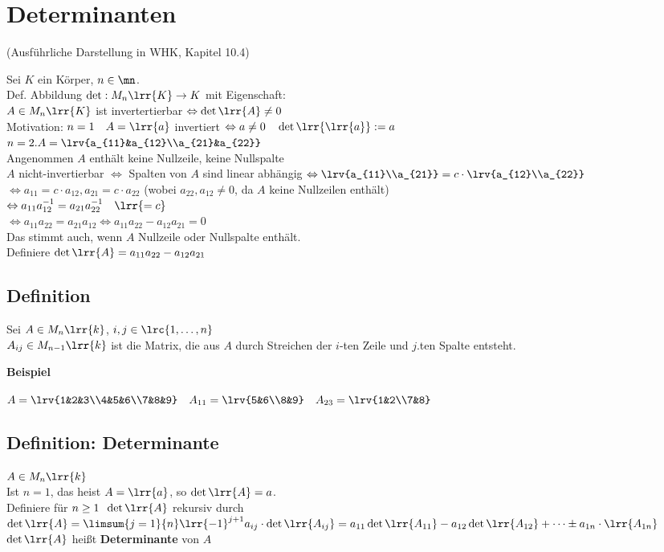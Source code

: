 \newpage
\section{Determinanten}
	(Ausführliche Darstellung in WHK, Kapitel 10.4)

	Sei $K$ ein Körper, $n\in\mn$.\\
	Def. Abbildung $\det:M_n\lrr{K}\rightarrow K$ mit Eigenschaft:\\
	$A\in M_n\lrr{K}$ ist invertertierbar $\Leftrightarrow\det\lrr{A}\neq 0$\\
	Motivation: $n=1\quad A=\lrr{a}$ invertiert $\Leftrightarrow a\neq 0\quad\det\lrr{\lrr{a}}:=a$\\
	$n=2. A=\lrv{a_{11}&a_{12}\\a_{21}&a_{22}}$\\
	Angenommen $A$ enthält keine Nullzeile, keine Nullspalte\\
	$A$ nicht-invertierbar $\Leftrightarrow$ Spalten von $A$ sind linear abhängig $\Leftrightarrow\lrv{a_{11}\\a_{21}}=c\cdot\lrv{a_{12}\\a_{22}}$\\
	$\Leftrightarrow a_{11}=c\cdot a_{12}, a_{21}=c\cdot a_{22}$ (wobei $a_{22},a_{12}\neq 0$, da $A$ keine Nullzeilen enthält)\\
	$\Leftrightarrow a_{11}a_{12}^{-1}=a_{21}a_{22}^{-1}\quad \lrr{=c}$\\
	$\Leftrightarrow a_{11}a_{22}=a_{21}a_{12}\Leftrightarrow a_{11}a_{22}-a_{12}a_{21}=0$\\
	Das stimmt auch, wenn $A$ Nullzeile oder Nullspalte enthält.\\
	Definiere $\det\lrr{A}=a_{11}a_{22}-a_{12}a_{21}$

\subsection{Definition}
	Sei $A\in M_n\lrr{k}$, $i,j\in\lrc{1,\dots,n}$\\
	$A_{ij}\in M_{n-1}\lrr{k}$ ist die Matrix, die aus $A$ durch Streichen der $i$-ten Zeile und $j$.ten Spalte entsteht.

	\textbf{Beispiel}

	$A=\lrv{1&2&3\\4&5&6\\7&8&9}\quad A_{11}=\lrv{5&6\\8&9}\quad A_{23}=\lrv{1&2\\7&8}$

\subsection{Definition: Determinante}
	$A\in M_n\lrr{k}$\\
	Ist $n=1$, das heist $A=\lrr{a}$, so $\det\lrr{A}=a$.\\
	Definiere für $n\geq 1 \;\; \det\lrr{A}$ rekursiv durch\\
  $\det\lrr{A}=\limsum{j=1}{n}\lrr{-1}^{j+1}a_{ij}\cdot\det\lrr{A_{ij}}=a_{11}\det\lrr{A_{11}}-a_{12}\det\lrr{A_{12}}+\dots\pm
  a_{1n}\cdot\lrr{A_{1n}}$\\
	$\det\lrr{A}$ heißt \textbf{Determinante} von $A$

